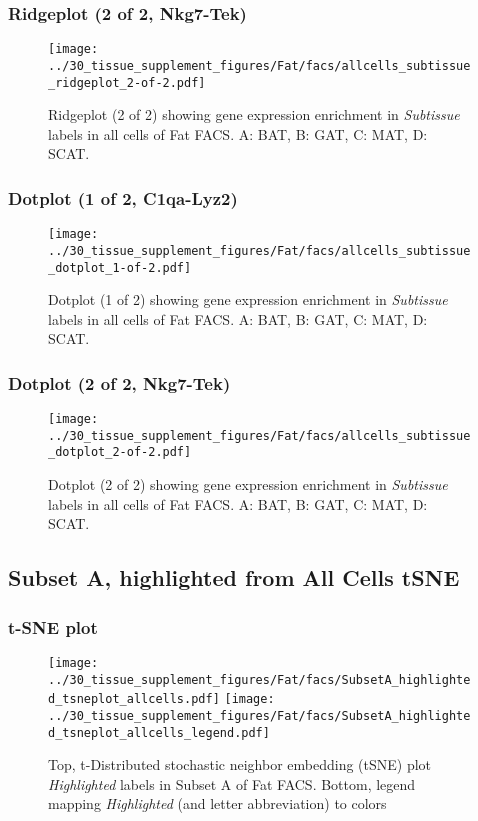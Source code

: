 \clearpage

\subsubsection{Ridgeplot (2 of 2, Nkg7-Tek)}
\begin{figure}[h]
\centering
\texttt{[image: ../30\_tissue\_supplement\_figures/Fat/facs/allcells\_subtissue\_ridgeplot\_2-of-2.pdf]}

\caption{ Ridgeplot (2 of 2)  showing gene expression enrichment in \emph{Subtissue} labels in all cells of Fat FACS. A: BAT, B: GAT, C: MAT, D: SCAT.}
\end{figure}


\clearpage

\subsubsection{Dotplot (1 of 2, C1qa-Lyz2)}
\begin{figure}[h]
\centering
\texttt{[image: ../30\_tissue\_supplement\_figures/Fat/facs/allcells\_subtissue\_dotplot\_1-of-2.pdf]}

\caption{ Dotplot (1 of 2)  showing gene expression enrichment in \emph{Subtissue} labels in all cells of Fat FACS. A: BAT, B: GAT, C: MAT, D: SCAT.}
\end{figure}


\clearpage

\subsubsection{Dotplot (2 of 2, Nkg7-Tek)}
\begin{figure}[h]
\centering
\texttt{[image: ../30\_tissue\_supplement\_figures/Fat/facs/allcells\_subtissue\_dotplot\_2-of-2.pdf]}

\caption{ Dotplot (2 of 2)  showing gene expression enrichment in \emph{Subtissue} labels in all cells of Fat FACS. A: BAT, B: GAT, C: MAT, D: SCAT.}
\end{figure}


\clearpage
\subsection{Subset A, highlighted from All Cells tSNE}
\subsubsection{t-SNE plot}
\begin{figure}[h]
\centering
\texttt{[image: ../30\_tissue\_supplement\_figures/Fat/facs/SubsetA\_highlighted\_tsneplot\_allcells.pdf]}
\texttt{[image: ../30\_tissue\_supplement\_figures/Fat/facs/SubsetA\_highlighted\_tsneplot\_allcells\_legend.pdf]}
\caption{Top, t-Distributed stochastic neighbor embedding (tSNE) plot  \emph{Highlighted} labels in Subset A of Fat FACS. Bottom, legend mapping \emph{Highlighted} (and letter abbreviation) to colors}
\end{figure}


